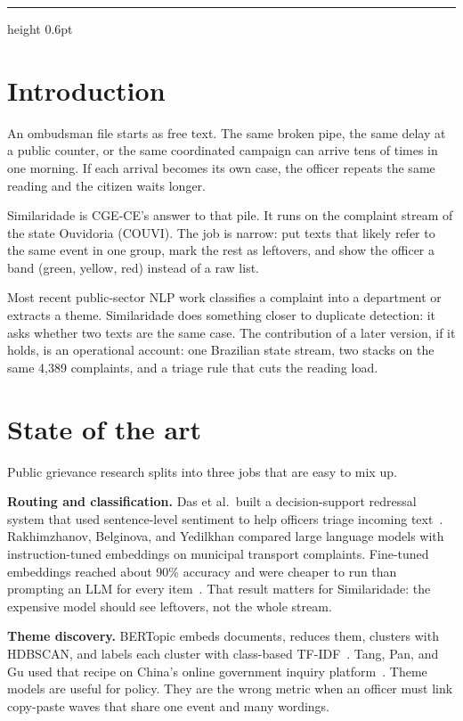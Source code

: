 \documentclass[11pt,a4paper]{article}
\begin{document}
\vspace{0.3em}
{\color{rulec}\hrule height 0.6pt}
\vspace{1em}

\section{Introduction}
An ombudsman file starts as free text. The same broken pipe, the same delay at a public counter, or the same coordinated campaign can arrive tens of times in one morning. If each arrival becomes its own case, the officer repeats the same reading and the citizen waits longer.

Similaridade is CGE-CE's answer to that pile. It runs on the complaint stream of the state Ouvidoria (COUVI). The job is narrow: put texts that likely refer to the same event in one group, mark the rest as leftovers, and show the officer a band (green, yellow, red) instead of a raw list.

Most recent public-sector NLP work classifies a complaint into a department or extracts a theme. Similaridade does something closer to duplicate detection: it asks whether two texts are the same case. The contribution of a later version, if it holds, is an operational account: one Brazilian state stream, two stacks on the same 4{,}389 complaints, and a triage rule that cuts the reading load.

\section{State of the art}
Public grievance research splits into three jobs that are easy to mix up.

\textbf{Routing and classification.}
Das et al.\ built a decision-support redressal system that used sentence-level sentiment to help officers triage incoming text~\cite{das2020grievance}. Rakhimzhanov, Belginova, and Yedilkhan compared large language models with instruction-tuned embeddings on municipal transport complaints. Fine-tuned embeddings reached about 90\% accuracy and were cheaper to run than prompting an LLM for every item~\cite{rakhimzhanov2025transport}. That result matters for Similaridade: the expensive model should see leftovers, not the whole stream.

\textbf{Theme discovery.}
BERTopic embeds documents, reduces them, clusters with HDBSCAN, and labels each cluster with class-based TF-IDF~\cite{grootendorst2022bertopic}. Tang, Pan, and Gu used that recipe on China's online government inquiry platform~\cite{tang2024bertopic}. Theme models are useful for policy. They are the wrong metric when an officer must link copy-paste waves that share one event and many wordings.
\end{document}
